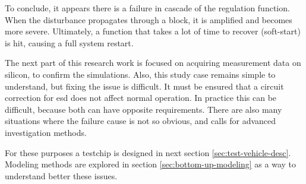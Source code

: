 To conclude, it appears there is a failure in cascade of the regulation function.
When the disturbance propagates through a block, it is amplified and becomes more severe.
Ultimately, a function that takes a lot of time to recover (soft-start) is hit, causing a full system restart.

The next part of this research work is focused on acquiring measurement data on silicon, to confirm the simulations.
Also, this study case remains simple to understand, but fixing the issue is difficult.
It must be ensured that a circuit correction for \gls{esd} does not affect normal operation.
In practice this can be difficult, because both can have opposite requirements.
There are also many situations where the failure cause is not so obvious, and calls for advanced investigation methods.

For these purposes a testchip is designed in next section \ref{sec:test-vehicle-desc}.
Modeling methods are explored in section \ref{sec:bottom-up-modeling} as a way to understand better these issues.
